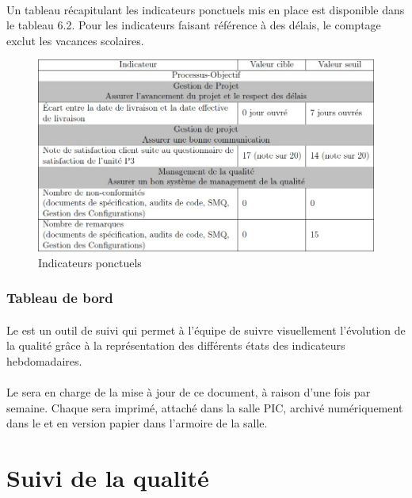\paragraph*{} Un tableau récapitulant les indicateurs ponctuels mis en place est disponible dans le tableau
6.2. Pour les indicateurs faisant référence à des délais, le comptage exclut les vacances scolaires.
\begin{figure}[h]
   \center
   \caption{\label{Tableau 6.2} Indicateurs ponctuels}
   \includegraphics[width=13cm]{./images/Indicateurs_ponctuels.jpg}
\end{figure}

\subsubsection*{Tableau de bord}

\paragraph*{} Le \TB est un outil de suivi qui permet à l'équipe \nomEquipe de suivre visuellement l'évolution de la qualité grâce à la représentation des différents états des indicateurs
hebdomadaires.

\paragraph*{} Le \RQ sera en charge de la mise à jour de ce document, à raison d'une
fois par semaine. Chaque \TB sera imprimé, attaché dans la salle PIC, archivé
numériquement dans le \DSQ et en version papier dans l'armoire de la salle.

\section{Suivi de la qualité}
